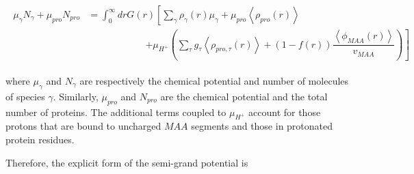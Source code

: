 \documentclass[journal=jacsat,manuscript=suppinfo]{achemso}
\begin{document}
\begin{align}
	\begin{aligned}
		\mu_\gamma N_\gamma + \mu_{pro} N_{pro} &=\int_0^\infty drG(r)\left[\sum_{\gamma }{\rho_\gamma(r)\mu_\gamma}
		+ \mu_{pro} \left<\rho_{pro}(r)\right> \right. \\
		& \hspace{6em}\left. +\mu_{H^+}\left(\sum_{\tau}{g_\tau\left<\rho_{pro,\tau}(r)\right> } +(1-f(r))\dfrac{\left<\phi_{MAA}(r)\right>}{v_{MAA}}\right)\right]
	\end{aligned}
\end{align}

\noindent where  $\mu_\gamma$ and $N_\gamma$ are respectively the chemical potential and  number of molecules of species $\gamma$.
Similarly, $\mu_{pro}$ and $N_{pro}$ are the chemical potential and the total number of proteins.
The additional terms coupled to $\mu_{H^+}$
account for those protons that are bound to uncharged $MAA$ segments and those in protonated protein residues.




Therefore, the explicit form of the semi-grand potential is
\end{document}
